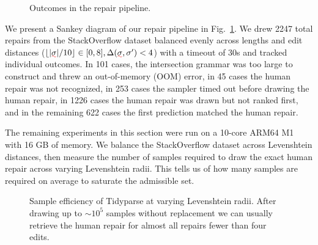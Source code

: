 \documentclass[sigplan,acmsmall,nonacm,screen]{acmart}\settopmatter{printfolios=false,printccs=false,printacmref=false}
\begin{document}
  \begin{figure}
    \vspace{-1.2cm}
    \hspace{-0.8cm}
    \resizebox{.47\textwidth}{!}{}
    \vspace{-1.4cm}
    \caption{Outcomes in the repair pipeline.}
    \label{fig:sankey}
  \end{figure}


  We present a Sankey diagram of our repair pipeline in Fig.~\ref{fig:sankey}. We drew 2247 total repairs from the StackOverflow dataset balanced evenly across lengths and edit distances ($\lfloor|\err\sigma| / 10\rfloor \in [0, 8], \Delta(\err\sigma, \sigma') < 4$) with a timeout of 30s and tracked individual outcomes. In 101 cases, the intersection grammar was too large to construct and threw an out-of-memory (OOM) error, in 45 cases the human repair was not recognized, in 253 cases the sampler timed out before drawing the human repair, in 1226 cases the human repair was drawn but not ranked first, and in the remaining 622 cases the first prediction matched the human repair.

  \clearpage The remaining experiments in this section were run on a 10-core ARM64 M1 with 16 GB of memory. We balance the StackOverflow dataset across Levenshtein distances, then measure the number of samples required to draw the exact human repair across varying Levenshtein radii. This tells us of how many samples are required on average to saturate the admissible set.

  \begin{figure}[h!]
    
    \caption{Sample efficiency of Tidyparse at varying Levenshtein radii. After drawing up to $\sim10^5$ samples without replacement we can usually retrieve the human repair for almost all repairs fewer than four edits.}\label{fig:sample_efficiency}
  \end{figure}

\end{document}

